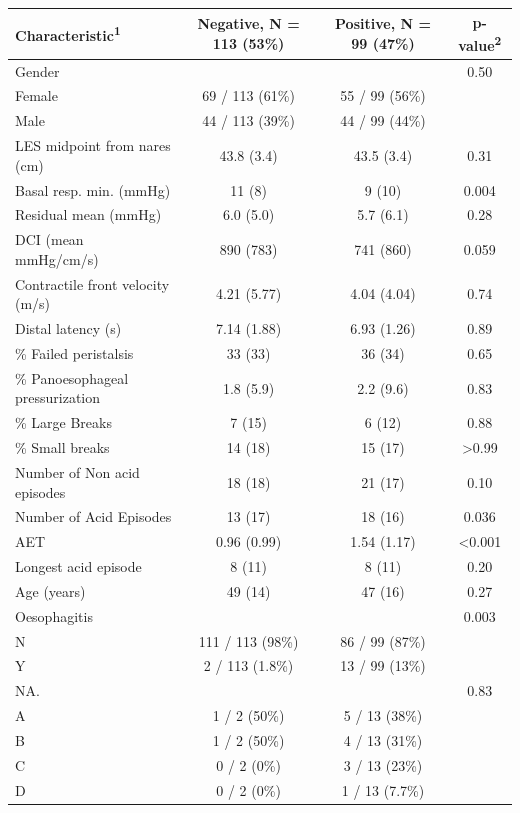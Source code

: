 \documentclass[english,man,floatsintext]{apa6}
\begin{document}
\captionsetup[table]{labelformat=empty,skip=1pt}
\begin{longtable}{lccc}
\toprule
\textbf{Characteristic}\textsuperscript{1} & \textbf{Negative}, N = 113 (53\%) & \textbf{Positive}, N = 99 (47\%) & \textbf{p-value}\textsuperscript{2} \\ 
\midrule
Gender &  &  & 0.50 \\ 
Female & 69 / 113 (61\%) & 55 / 99 (56\%) &  \\ 
Male & 44 / 113 (39\%) & 44 / 99 (44\%) &  \\ 
LES midpoint from nares (cm) & 43.8 (3.4) & 43.5 (3.4) & 0.31 \\ 
Basal resp. min. (mmHg) & 11 (8) & 9 (10) & 0.004 \\ 
Residual mean (mmHg) & 6.0 (5.0) & 5.7 (6.1) & 0.28 \\ 
DCI (mean mmHg/cm/s) & 890 (783) & 741 (860) & 0.059 \\ 
Contractile front velocity (m/s) & 4.21 (5.77) & 4.04 (4.04) & 0.74 \\ 
Distal latency (s) & 7.14 (1.88) & 6.93 (1.26) & 0.89 \\ 
\% Failed peristalsis & 33 (33) & 36 (34) & 0.65 \\ 
\% Panoesophageal pressurization & 1.8 (5.9) & 2.2 (9.6) & 0.83 \\ 
\% Large Breaks & 7 (15) & 6 (12) & 0.88 \\ 
\% Small breaks & 14 (18) & 15 (17) & >0.99 \\ 
Number of Non acid episodes & 18 (18) & 21 (17) & 0.10 \\ 
Number of Acid Episodes & 13 (17) & 18 (16) & 0.036 \\ 
AET & 0.96 (0.99) & 1.54 (1.17) & <0.001 \\ 
Longest acid episode & 8 (11) & 8 (11) & 0.20 \\ 
Age (years) & 49 (14) & 47 (16) & 0.27 \\ 
Oesophagitis &  &  & 0.003 \\ 
N & 111 / 113 (98\%) & 86 / 99 (87\%) &  \\ 
Y & 2 / 113 (1.8\%) & 13 / 99 (13\%) &  \\ 
NA. &  &  & 0.83 \\ 
A & 1 / 2 (50\%) & 5 / 13 (38\%) &  \\ 
B & 1 / 2 (50\%) & 4 / 13 (31\%) &  \\ 
C & 0 / 2 (0\%) & 3 / 13 (23\%) &  \\ 
D & 0 / 2 (0\%) & 1 / 13 (7.7\%) &  \\ 

\end{longtable}
\end{document}
